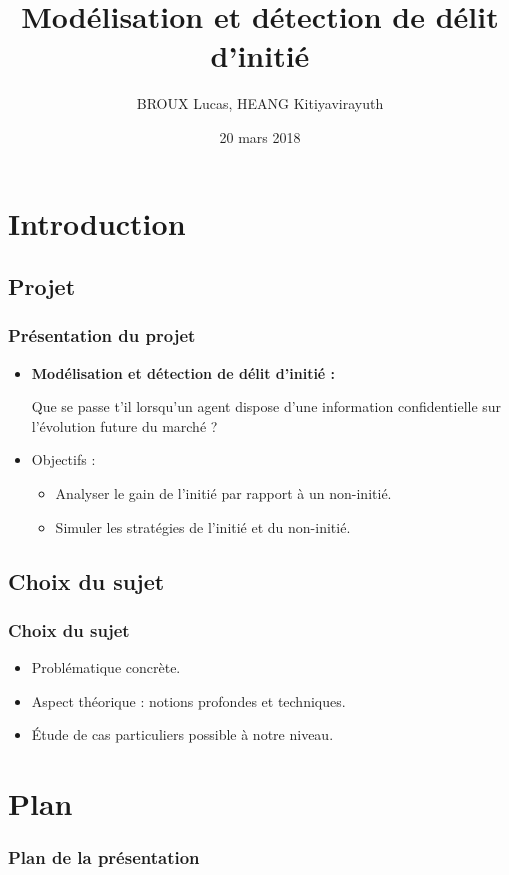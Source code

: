 \documentclass{beamer}
\title{Modélisation et détection de délit d'initié}
\author{BROUX Lucas, HEANG Kitiyavirayuth}
\date{20 mars 2018}
\begin{document}
\begin{frame}
\titlepage
\end{frame}

\section{Introduction}
\subsection{Projet}
\begin{frame}
\frametitle{Présentation du projet}
\begin{itemize}
\item \textbf{Modélisation et détection de délit d'initié :}
\par Que se passe t'il lorsqu'un agent dispose d'une information confidentielle sur l'évolution future du marché ?
\item Objectifs :
	\begin{itemize}
	\item Analyser le gain de l'initié par rapport à un non-initié.
	\item Simuler les stratégies de l'initié et du non-initié.
	\end{itemize}
\end{itemize}
\end{frame}

\subsection{Choix du sujet}
\begin{frame}
\frametitle{Choix du sujet}
\begin{itemize}
\item Problématique concrète.
\item Aspect théorique : notions profondes et techniques.
\item Étude de cas particuliers possible à notre niveau.
\end{itemize}
\end{frame}

\section*{Plan}
\begin{frame}
\frametitle{Plan de la présentation}
\tableofcontents
\end{frame}

\end{document}
